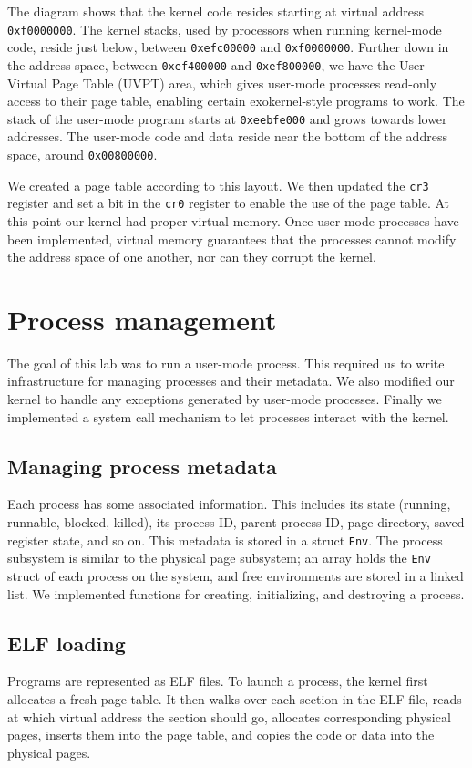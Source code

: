 \documentclass{report}
\begin{document}
The diagram shows that the kernel code resides starting at virtual address
\texttt{0xf0000000}. The kernel stacks, used by processors when running
kernel-mode code, reside just below, between \texttt{0xefc00000} and
\texttt{0xf0000000}. Further down in the address space, between
\texttt{0xef400000} and \texttt{0xef800000}, we have the User Virtual Page
Table (UVPT) area, which gives user-mode processes read-only access to their
page table, enabling certain exokernel-style programs to work. The stack of
the user-mode program starts at \texttt{0xeebfe000} and grows towards lower
addresses. The user-mode code and data reside near the bottom of the address
space, around \texttt{0x00800000}.

We created a page table according to this layout. We then updated the
\texttt{cr3} register and set a bit in the \texttt{cr0} register to enable the
use of the page table. At this point our kernel had proper virtual memory.
Once user-mode processes have been implemented, virtual memory guarantees that
the processes cannot modify the address space of one another, nor can they
corrupt the kernel.


\chapter{Process management}

The goal of this lab was to run a user-mode process. This required us to write
infrastructure for managing processes and their metadata. We also modified our
kernel to handle any exceptions generated by user-mode processes. Finally we
implemented a system call mechanism to let processes interact with the kernel.


\section{Managing process metadata}
Each process has some associated information. This includes its state
(running, runnable, blocked, killed), its process ID, parent process ID, page
directory, saved register state, and so on. This metadata is stored in a
struct \texttt{Env}. The process subsystem is similar to the physical page
subsystem; an array holds the \texttt{Env} struct of each process on the
system, and free environments are stored in a linked list. We implemented
functions for creating, initializing, and destroying a process.

\section{ELF loading}
Programs are represented as ELF files. To launch a process, the kernel first
allocates a fresh page table. It then walks over each section in the ELF file,
reads at which virtual address the section should go, allocates corresponding
physical pages, inserts them into the page table, and copies the code or data
into the physical pages.
\end{document}
